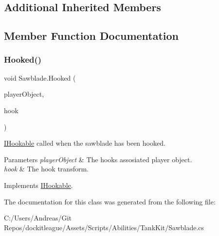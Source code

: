 \subsection*{Additional Inherited Members}


\subsection{Member Function Documentation}
\hypertarget{class_sawblade_a38819b3411e1492b0eeb19ffcaf1dfb1}{}\label{class_sawblade_a38819b3411e1492b0eeb19ffcaf1dfb1} 
\subsubsection{\texorpdfstring{Hooked()}{Hooked()}}
{\footnotesize\ttfamily void Sawblade.\+Hooked (\begin{DoxyParamCaption}\item[{Game\+Object}]{player\+Object,  }\item[{Transform}]{hook }\end{DoxyParamCaption})}



\hyperlink{interface_i_hookable}{I\+Hookable} called when the sawblade has been hooked. 


\begin{DoxyParams}{Parameters}
{\em player\+Object} & The hook\textquotesingle{}s assosiated player object.\\
\hline
{\em hook} & The hook transform.\\
\hline
\end{DoxyParams}


Implements \hyperlink{interface_i_hookable_a81d9592915b1eb00f87ebc27adc9419e}{I\+Hookable}.



The documentation for this class was generated from the following file\+:\begin{DoxyCompactItemize}
\item 
C\+:/\+Users/\+Andreas/\+Git Repos/dockitleague/\+Assets/\+Scripts/\+Abilities/\+Tank\+Kit/Sawblade.\+cs\end{DoxyCompactItemize}
